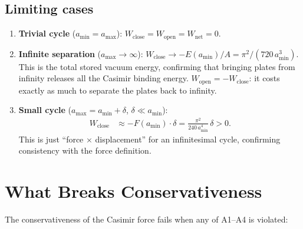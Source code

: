 \documentclass[11pt]{article}
\begin{document}
\subsection{Limiting cases}

\begin{enumerate}
  \item \textbf{Trivial cycle} ($a_\mathrm{min} = a_\mathrm{max}$):
    $W_\mathrm{close} = W_\mathrm{open} = W_\mathrm{net} = 0$. \checkmark

  \item \textbf{Infinite separation}
    ($a_\mathrm{max} \to \infty$):
    $W_\mathrm{close} \to -E(a_\mathrm{min})/A = \pi^2/(720\,a_\mathrm{min}^3)$.
    This is the total stored vacuum energy, confirming that bringing
    plates from infinity releases all the Casimir binding energy.
    $W_\mathrm{open} = -W_\mathrm{close}$: it costs exactly as much
    to separate the plates back to infinity. \checkmark

  \item \textbf{Small cycle}
    ($a_\mathrm{max} = a_\mathrm{min} + \delta$, $\delta \ll a_\mathrm{min}$):
    \begin{align}
      W_\mathrm{close} &\approx -F(a_\mathrm{min})\cdot\delta
      = \frac{\pi^2}{240\,a_\mathrm{min}^4}\,\delta > 0.
    \end{align}
    This is just ``force $\times$ displacement'' for an infinitesimal
    cycle, confirming consistency with the force definition. \checkmark
\end{enumerate}

\section{What Breaks Conservativeness}

The conservativeness of the Casimir force fails when any of
A1--A4 is violated:
\end{document}
